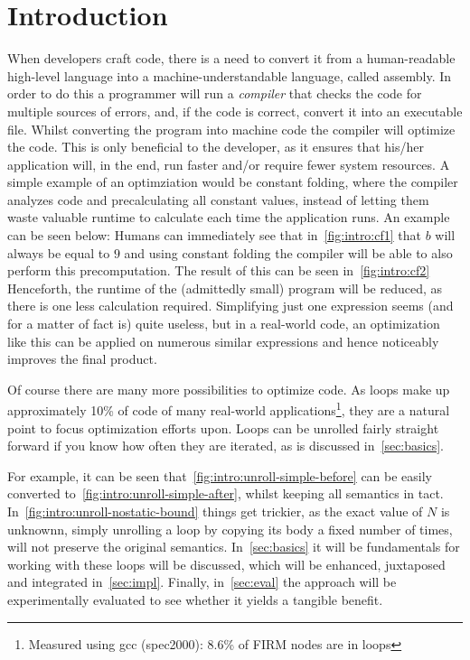 \chapter{Introduction}\label{sec:intro}



When developers craft code, there is a need to convert it from a human-readable high-level language into a machine-understandable language, called assembly.
In order to do this a programmer will run a \textit{compiler} that checks the code for multiple sources of errors, and, if the code is correct, convert it into an executable file.
Whilst converting the program into machine code the compiler will optimize the code.
This is only beneficial to the developer, as it ensures that his/her application will, in the end, run faster and/or require fewer system resources.
A simple example of an optimziation would be constant folding, where the compiler analyzes code and precalculating all constant values, instead of letting them waste valuable runtime to calculate each time the application runs.
An example can be seen below:
Humans can immediately see that in~\cref{fig:intro:cf1} that $b$ will always be equal to $9$ and using constant folding the compiler will be able to also perform this precomputation.
The result of this can be seen in~\cref{fig:intro:cf2}
Henceforth, the runtime of the (admittedly small) program will be reduced, as there is one less calculation required.
Simplifying just one expression seems (and for a matter of fact is) quite useless, but in a real-world code, an optimization like this can be applied on numerous similar expressions and hence noticeably improves the final product.



Of course there are many more possibilities to optimize code.
As loops make up approximately 10\% of code of many real-world applications\footnote{Measured using gcc (spec2000): 8.6\% of FIRM nodes are in loops}, they are a natural point to focus optimization efforts upon.
Loops can be unrolled fairly straight forward if you know how often they are iterated, as is discussed in~\cref{sec:basics}.

For example, it can be seen that~\cref{fig:intro:unroll-simple-before} can be easily converted to~\cref{fig:intro:unroll-simple-after}, whilst keeping all semantics in tact.
In~\cref{fig:intro:unroll-nostatic-bound} things get trickier, as the exact value of $N$ is unknownn, simply unrolling a loop by copying its body a fixed number of times, will not preserve the original semantics.
In~\cref{sec:basics} it will be fundamentals for working with these loops will be discussed, which will be enhanced, juxtaposed and integrated in~\cref{sec:impl}.
Finally, in~\cref{sec:eval} the approach will be experimentally evaluated to see whether it yields a tangible benefit.




